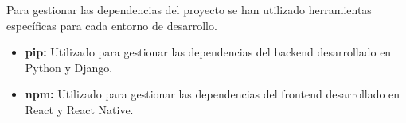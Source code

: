 Para gestionar las dependencias del proyecto se han utilizado herramientas específicas para cada entorno de desarrollo.

\begin{itemize}
    \item \textbf{pip:} Utilizado para gestionar las dependencias del backend desarrollado en Python y Django.
    \item \textbf{npm:} Utilizado para gestionar las dependencias del frontend desarrollado en React y React Native.
\end{itemize}